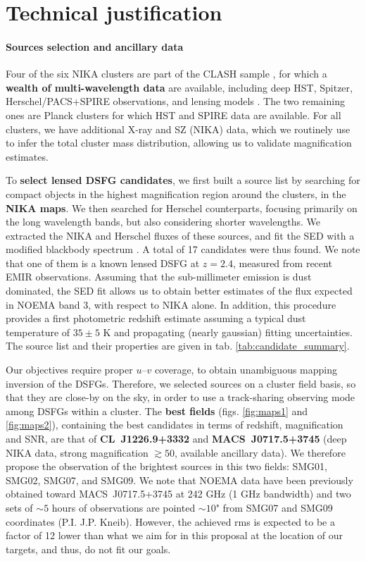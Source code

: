 \documentclass[11pt,a4paper,twoside,graphicx,color]{article}
\begin{document}
\section{Technical justification}
\paragraph{\large Sources selection and ancillary data}
Four of the six NIKA clusters are part of the CLASH sample \citep{Postman2012}, for which a {\bf wealth of multi-wavelength data} are available, including deep HST, Spitzer, Herschel/PACS+SPIRE observations, and lensing models \citep[e.g.,][]{Zitrin2015}. The two remaining ones are Planck clusters for which HST and SPIRE data are available. For all clusters, we have additional X-ray and SZ (NIKA) data, which we routinely use to infer the total cluster mass distribution, allowing us to validate magnification estimates.

To {\bf select lensed DSFG candidates}, we first built a source list by searching for compact objects in the highest magnification region around the clusters, in the {\bf NIKA maps}. We then searched for Herschel counterparts, focusing primarily on the long wavelength bands, but also considering shorter wavelengths. We extracted the NIKA and Herschel fluxes of these sources, and fit the SED with a modified blackbody spectrum \cite[see fig. \ref{fig:SED} and ][for details]{Adam2016a}. A total of 17 candidates were thus found. We note that one of them is a known lensed DSFG at $z=2.4$, measured from recent EMIR observations. Assuming that the sub-millimeter emission is dust dominated, the SED fit allows us to obtain better estimates of the flux expected in NOEMA band 3, with respect to NIKA alone. In addition, this procedure provides a first photometric redshift estimate assuming a typical dust temperature of $35 \pm 5$ K and propagating (nearly gaussian) fitting uncertainties. The source list and their properties are given in tab. \ref{tab:candidate_summary}.

Our objectives require proper $u$--$v$ coverage, to obtain unambiguous mapping inversion of the DSFGs. Therefore, we selected sources on a cluster field basis, so that they are close-by on the sky, in order to use a track-sharing observing mode among DSFGs within a cluster. The {\bf best fields} (figs. \ref{fig:maps1} and \ref{fig:maps2}), containing the best candidates in terms of redshift, magnification and SNR, are that of {\bf \mbox{CL~J1226.9+3332}} and {\bf \mbox{MACS~J0717.5+3745}} (deep NIKA data, strong magnification $\gtrsim 50$, available ancillary data). We therefore propose the observation of the brightest sources in this two fields: SMG01, SMG02, SMG07, and SMG09. We note that NOEMA data have been previously obtained toward \mbox{MACS~J0717.5+3745} at 242 GHz (1 GHz bandwidth) and two sets of $\sim 5$ hours of observations are pointed $\sim 10$" from SMG07 and SMG09 coordinates (P.I. J.P. Kneib). However, the achieved rms is expected to be a factor of 12 lower than what we aim for in this proposal at the location of our targets, and thus, do not fit our goals.
\end{document}
